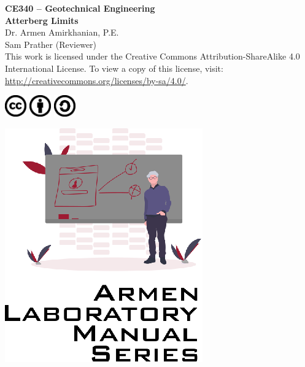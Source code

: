 \documentclass[12pt]{article}
\newcommand{\CourseNum}{CE340}
\newcommand{\CourseName}{Geotechnical Engineering}
\newcommand{\LabTitle}{Atterberg Limits}
\begin{document}
\begin{titlepage}
\begin{flushright}
\LARGE{\textbf{\CourseNum{} -- \CourseName}}\\
\vfill
\Huge{\textbf{\LabTitle}}\\
    \vfill
    \large Dr. Armen Amirkhanian, P.E.\\
    \normalsize Sam Prather (Reviewer)\\
\vfill
\normalsize This work is licensed under the Creative Commons Attribution-ShareAlike 4.0 International License. To view a copy of this license, visit:
\href{http://creativecommons.org/licenses/by-sa/4.0/}{http://creativecommons.org/licenses/by-sa/4.0/}.

\includegraphics[width=0.07\textwidth]{cc.eps}
\includegraphics[width=0.07\textwidth]{by.eps}
\includegraphics[width=0.07\textwidth]{sa.eps}
\vfill

\includegraphics[width=0.3\linewidth]{Logo.eps}\\ 
 
  
\end{flushright}
\end{titlepage}
\end{document}
